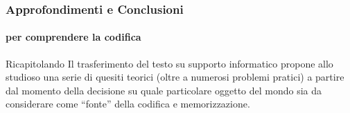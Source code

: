 









\begin{frame}
	\frametitle{Approfondimenti e Conclusioni}
	\framesubtitle{per comprendere la codifica}
	\addtocounter{nframe}{1}

	\begin{block}{Ricapitolando}
		Il trasferimento del testo su supporto informatico propone allo studioso una serie di quesiti teorici (oltre a numerosi problemi pratici) a partire dal momento della decisione su quale particolare oggetto del mondo sia da considerare come ``fonte'' della codifica e memorizzazione.
	\end{block}


\end{frame}

